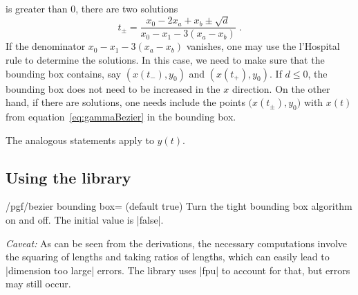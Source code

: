 %
is greater than 0, there are two solutions
%
    \begin{equation}
        t_\pm = \frac{x_{0} - 2x_{a} + x_{b}
            \pm \sqrt{d}}{x_{0} - x_{1} - 3(x_{a}- x_{b})}  \;.
    \end{equation}
%
If the denominator $x_{0} - x_{1} - 3(x_{a} - x_{b})$ vanishes, one may use the
l'Hospital rule to determine the solutions. In this case, we need to make sure
that the bounding box contains, say $(x(t_-),y_0)$ and $(x(t_+),y_0)$. If $d
\le 0$, the bounding box does not need to be increased in the $x$ direction. On
the other hand, if there are solutions, one needs include the points
$\bigl(x(t_\pm),y_0\bigr)$ with $x(t)$ from equation~\eqref{eq:gammaBezier} in
the bounding box.

The analogous statements apply to $y(t)$.


\subsection{Using the library}

\begin{key}{/pgf/bezier bounding box= (default true)}
    Turn the tight bounding box algorithm on and off. The initial value is
    |false|.

    \emph{Caveat:} As can be seen from the derivations, the necessary
    computations involve the squaring of lengths and taking ratios of lengths,
    which can easily lead to |dimension too large| errors. The library uses
    |fpu| to account for that, but errors may still occur.
\end{key}

\begin{codeexample}[width=5cm,preamble={\usetikzlibrary{bbox}}]
\end{codeexample}


